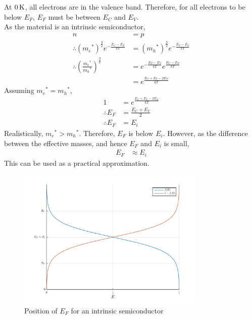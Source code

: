\documentclass[titlepage, fleqn, a4paper, 12pt, twoside]{article}
\theoremstyle{definition}
\theoremstyle{theorem}
\begin{document}
At $0 \kelvin$, all electrons are in the valence band.
Therefore, for all electrons to be below $E_F$, $E_F$ must be between $E_C$ and $E_V$.\\
As the material is an intrinsic semiconductor,
\begin{align*}
	n                                                                          & = p                                                               \\
	\therefore \left( {m_e}^* \right)^{\frac{3}{2}} e^{-\frac{E_C - E_F}{k T}} & = \left( {m_h}^* \right)^{\frac{3}{2}} e^{-\frac{E_F - E_V}{k T}} \\
	\therefore \left( \frac{{m_e}^*}{{m_h}^*} \right)^{\frac{3}{2}}            & = e^{-\frac{E_F - E_V}{k T}} e^{\frac{E_C - E_F}{k T}}            \\
                                                                                   & = e^{\frac{E_C + E_V - 2 E_F}{k T}}
\end{align*}
Assuming ${m_e}^* = {m_h}^*$,
\begin{align*}
	1              & = e^{\frac{E_C + E_V - 2 E_F}{k T}} \\
	\therefore E_F & = \frac{E_C + E_V}{2}               \\
	\therefore E_F & = E_i
\end{align*}
Realistically, ${m_e}^* > {m_h}^*$.
Therefore, $E_F$ is below $E_i$.
However, as the difference between the effective masses, and hence $E_F$ and $E_i$ is small,
\begin{align*}
	E_F & \approx E_i
\end{align*}
This can be used as a practical approximation.
\begin{figure}[h]
	\centering
	\includegraphics[width = 0.8\textwidth]{./Plots/fermi_function_for_intrinsic.pdf}
	\caption{Position of $E_F$ for an intrinsic semiconductor}
	\label{fig:Position_of_$E_F$_for_an_intrinsic_semiconductor}
\end{figure}
\end{document}
